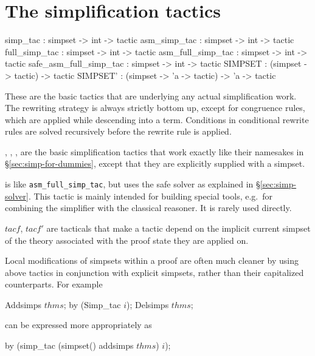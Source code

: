\section{The simplification tactics}\label{simp-tactics}
\begin{ttbox}
simp_tac               : simpset -> int -> tactic
asm_simp_tac           : simpset -> int -> tactic
full_simp_tac          : simpset -> int -> tactic
asm_full_simp_tac      : simpset -> int -> tactic
safe_asm_full_simp_tac : simpset -> int -> tactic
SIMPSET                : (simpset -> tactic) -> tactic
SIMPSET'               : (simpset -> 'a -> tactic) -> 'a -> tactic
\end{ttbox}

These are the basic tactics that are underlying any actual
simplification work.  The rewriting strategy is always strictly bottom
up, except for congruence rules, which are applied while descending
into a term.  Conditions in conditional rewrite rules are solved
recursively before the rewrite rule is applied.

\begin{ttdescription}
  
\item[\ttindexbold{simp_tac}, \ttindexbold{asm_simp_tac},
  \ttindexbold{full_simp_tac}, \ttindexbold{asm_full_simp_tac}] are
  the basic simplification tactics that work exactly like their
  namesakes in \S\ref{sec:simp-for-dummies}, except that they are
  explicitly supplied with a simpset.
  
\item[\ttindexbold{safe_asm_full_simp_tac}] is like
  \texttt{asm_full_simp_tac}, but uses the safe solver as explained in
  \S\ref{sec:simp-solver}.  This tactic is mainly intended for
  building special tools, e.g.\ for combining the simplifier with the
  classical reasoner.  It is rarely used directly.
  
\item[\ttindexbold{SIMPSET} $tacf$, \ttindexbold{SIMPSET'} $tacf'$]
  are tacticals that make a tactic depend on the implicit current
  simpset of the theory associated with the proof state they are
  applied on.

\end{ttdescription}

\medskip

Local modifications of simpsets within a proof are often much cleaner
by using above tactics in conjunction with explicit simpsets, rather
than their capitalized counterparts.  For example
\begin{ttbox}
Addsimps \(thms\);
by (Simp_tac \(i\));
Delsimps \(thms\);
\end{ttbox}
can be expressed more appropriately as
\begin{ttbox}
by (simp_tac (simpset() addsimps \(thms\)) \(i\));
\end{ttbox}

